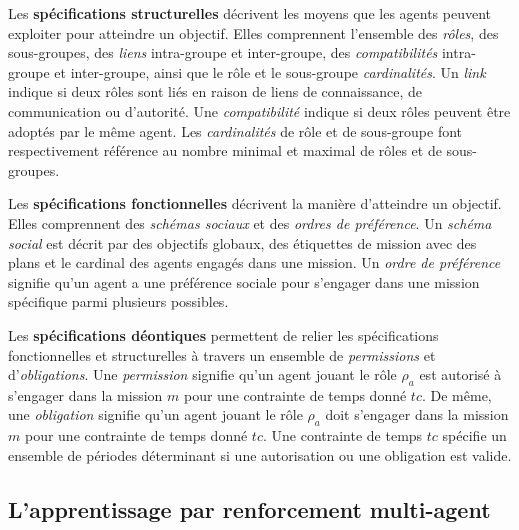 \documentclass[contribution]{jfsma}
\begin{document}
Les \textbf{spécifications structurelles} décrivent les moyens que les agents peuvent exploiter pour atteindre un objectif. Elles comprennent l'ensemble des \emph{rôles}, des sous-groupes, des \emph{liens} intra-groupe et inter-groupe, des \emph{compatibilités} intra-groupe et inter-groupe, ainsi que le rôle et le sous-groupe \emph {cardinalités}.
Un \emph{link} indique si deux rôles sont liés en raison de liens de connaissance, de communication ou d'autorité. Une \emph{compatibilité} indique si deux rôles peuvent être adoptés par le même agent. Les \emph{cardinalités} de rôle et de sous-groupe font respectivement référence au nombre minimal et maximal de rôles et de sous-groupes.

Les \textbf{spécifications fonctionnelles} décrivent la manière d'atteindre un objectif. Elles comprennent des \emph{schémas sociaux} et des \emph{ordres de préférence}. Un \emph{schéma social} est décrit par des objectifs globaux, des étiquettes de mission avec des plans et le cardinal des agents engagés dans une mission. Un \emph{ordre de préférence} signifie qu'un agent a une préférence sociale pour s'engager dans une mission spécifique parmi plusieurs possibles.

Les \textbf{spécifications déontiques} permettent de relier les spécifications fonctionnelles et structurelles à travers un ensemble de \emph{permissions} et d'\emph{obligations}. Une \emph{permission} signifie qu'un agent jouant le rôle $\rho_a$ est autorisé à s'engager dans la mission $m$ pour une contrainte de temps donné $tc$. De même, une \emph{obligation} signifie qu'un agent jouant le rôle $\rho_a$ doit s'engager dans la mission $m$ pour une contrainte de temps donné $tc$. Une contrainte de temps $tc $ spécifie un ensemble de périodes déterminant si une autorisation ou une obligation est valide.


\subsection{L'apprentissage par renforcement multi-agent}
\end{document}
